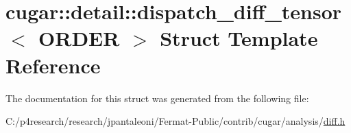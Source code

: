 \hypertarget{structcugar_1_1detail_1_1dispatch__diff__tensor}{}\section{cugar\+:\+:detail\+:\+:dispatch\+\_\+diff\+\_\+tensor$<$ O\+R\+D\+ER $>$ Struct Template Reference}
\label{structcugar_1_1detail_1_1dispatch__diff__tensor}


The documentation for this struct was generated from the following file\+:\begin{DoxyCompactItemize}
\item 
C\+:/p4research/research/jpantaleoni/\+Fermat-\/\+Public/contrib/cugar/analysis/\hyperlink{diff_8h}{diff.\+h}\end{DoxyCompactItemize}
